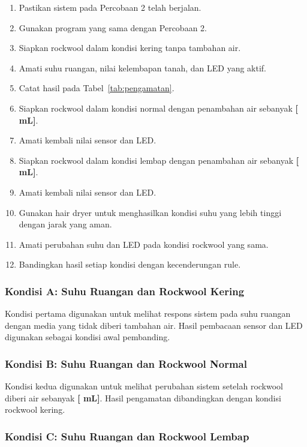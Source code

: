 \documentclass[12pt,a4paper]{article}
\begin{document}
\begin{enumerate}
    \item Pastikan sistem pada Percobaan 2 telah berjalan.
    \item Gunakan program yang sama dengan Percobaan 2.
    \item Siapkan rockwool dalam kondisi kering tanpa tambahan air.
    \item Amati suhu ruangan, nilai kelembapan tanah, dan LED yang aktif.
    \item Catat hasil pada Tabel~\ref{tab:pengamatan}.
    \item Siapkan rockwool dalam kondisi normal dengan penambahan air sebanyak \textbf{[\underline{\phantom{0000}} mL]}.
    \item Amati kembali nilai sensor dan LED.
    \item Siapkan rockwool dalam kondisi lembap dengan penambahan air sebanyak \textbf{[\underline{\phantom{0000}} mL]}.
    \item Amati kembali nilai sensor dan LED.
    \item Gunakan hair dryer untuk menghasilkan kondisi suhu yang lebih tinggi dengan jarak yang aman.
    \item Amati perubahan suhu dan LED pada kondisi rockwool yang sama.
    \item Bandingkan hasil setiap kondisi dengan kecenderungan rule.
\end{enumerate}

\subsubsection*{Kondisi A: Suhu Ruangan dan Rockwool Kering}

Kondisi pertama digunakan untuk melihat respons sistem pada suhu ruangan dengan media yang tidak diberi tambahan air. Hasil pembacaan sensor dan LED digunakan sebagai kondisi awal pembanding.

\subsubsection*{Kondisi B: Suhu Ruangan dan Rockwool Normal}

Kondisi kedua digunakan untuk melihat perubahan sistem setelah rockwool diberi air sebanyak \textbf{[\underline{\phantom{0000}} mL]}. Hasil pengamatan dibandingkan dengan kondisi rockwool kering.

\subsubsection*{Kondisi C: Suhu Ruangan dan Rockwool Lembap}
\end{document}
